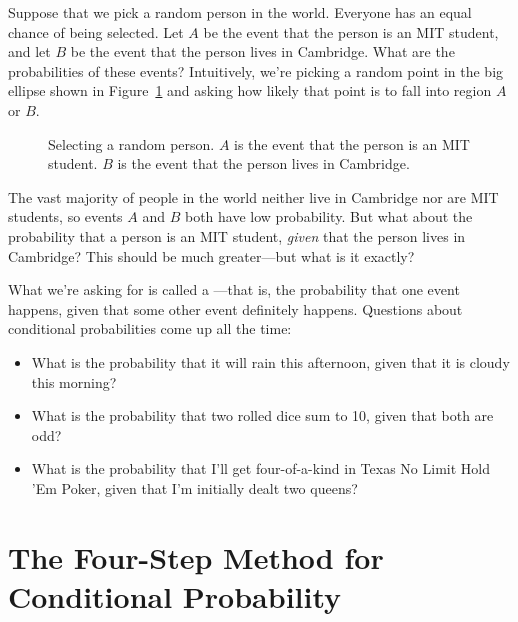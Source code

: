 \begin{editingnotes}


Suppose that we pick a random person in the world.  Everyone has an
equal chance of being selected.  Let $A$ be the event that the person
is an MIT student, and let $B$ be the event that the person lives in
Cambridge.  What are the probabilities of these events?  Intuitively,
we're picking a random point in the big ellipse shown in
Figure~\ref{fig:15B1} and asking how likely that point is to fall into
region $A$ or $B$.

\begin{figure}[h]


\caption{Selecting a random person.  $A$ is the event that the person
  is an MIT student.  $B$ is the event that the person lives in
  Cambridge.}

\label{fig:15B1}

\end{figure}

The vast majority of people in the world neither live in Cambridge nor
are MIT students, so events $A$ and $B$ both have low probability.
But what about the probability that a person is an MIT student,
\emph{given} that the person lives in Cambridge?  This should be
much greater---but what is it exactly?

What we're asking for is called a ---that is, the probability that one event happens,
given that some other event definitely happens.  Questions about
conditional probabilities come up all the time:
%
\begin{itemize}
\item What is the probability that it will rain this afternoon, given
that it is cloudy this morning?
\item What is the probability that two rolled dice sum to 10, given
that both are odd?
\item What is the probability that I'll get four-of-a-kind in Texas No
Limit Hold 'Em Poker, given that I'm initially dealt two queens?
\end{itemize}
\end{editingnotes}

\section{The Four-Step Method for Conditional Probability}

